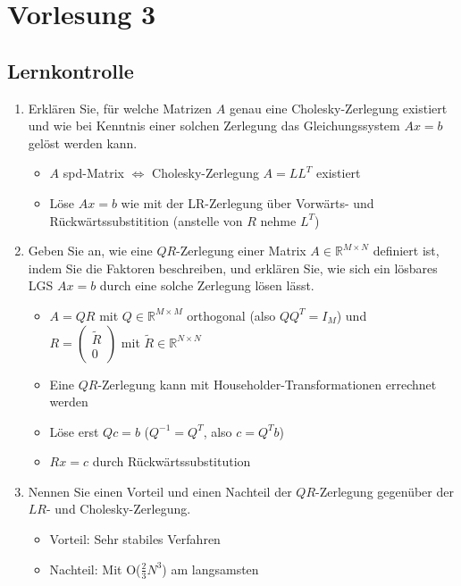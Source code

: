 \documentclass[]{article}
\begin{document}
\section{Vorlesung 3}
\subsection{Lernkontrolle}
	\begin{enumerate}
		\item Erklären Sie, für welche Matrizen $A$ genau eine Cholesky-Zerlegung existiert und wie bei Kenntnis einer solchen Zerlegung das Gleichungssystem $Ax=b$ gelöst werden kann.
			\begin{itemize}
				\item $A$ spd-Matrix $\Leftrightarrow$ Cholesky-Zerlegung $A=LL^T$ existiert
				\item Löse $Ax=b$ wie mit der LR-Zerlegung über Vorwärts- und Rückwärtssubstitition (anstelle von $R$ nehme $L^T$)
			\end{itemize}
		\item Geben Sie an, wie eine $QR$-Zerlegung einer Matrix $A \in \mathbb{R}^{M \times N}$ definiert ist, indem Sie die Faktoren beschreiben, und erklären Sie, wie sich ein lösbares LGS $Ax=b$ durch eine solche Zerlegung lösen lässt.
			\begin{itemize}
				\item $A=QR$ mit $Q \in \mathbb{R}^{M \times M}$ orthogonal (also $QQ^T = I_M$) und \\
				$R = \left (\begin{array}{r} \tilde{R} \\ 0 \end{array} \right)$ mit $\tilde{R} \in \mathbb{R}^{N \times N}$
				\item Eine $QR$-Zerlegung kann mit Householder-Transformationen errechnet werden
				\item Löse erst $Qc=b$ ($Q^{-1} = Q^T$, also $c = Q^Tb$)
				\item $Rx=c$ durch Rückwärtssubstitution
			\end{itemize}
		\item Nennen Sie einen Vorteil und einen Nachteil der $QR$-Zerlegung gegenüber der $LR$- und Cholesky-Zerlegung.
			\begin{itemize}
				\item Vorteil: Sehr stabiles Verfahren
				\item Nachteil: Mit O($\frac{2}{3} N^3$) am langsamsten
			\end{itemize}

\end{enumerate}
\end{document}
